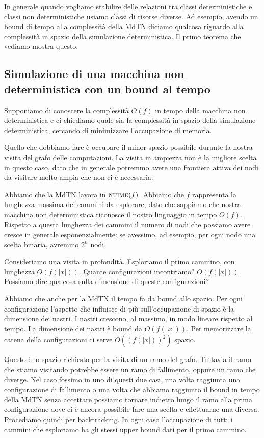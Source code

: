 
In generale quando vogliamo stabilire delle relazioni tra classi deterministiche e classi non
deterministiche usiamo classi di risorse diverse. Ad esempio, avendo un bound di tempo alla
complessità della MdTN diciamo qualcosa riguardo alla complessità in spazio della simulazione
deterministica. Il primo teorema che vediamo mostra questo.

\subsection{Simulazione di una macchina non deterministica con un bound al tempo}

Supponiamo di conoscere la complessità $O(f)$ in tempo della macchina non deterministica e ci
chiediamo quale sia la complessità in spazio della simulazione deterministica, cercando di
minimizzare l'occupazione di memoria.

Quello che dobbiamo fare è occupare il minor spazio possibile durante la nostra visita del grafo
delle computazioni. La visita in ampiezza non è la migliore scelta in questo caso, dato che in
generale potremmo avere una frontiera attiva dei nodi da visitare molto ampia che non ci è
necessaria.

Abbiamo che la MdTN lavora in $\textsc{ntime}(f)$. Abbiamo che $f$ rappresenta la lunghezza massima dei
cammini da esplorare, dato che sappiamo che nostra macchina non deterministica riconosce il nostro
linguaggio in tempo $O(f)$. Rispetto a questa lunghezza dei cammini il numero di nodi che possiamo
avere cresce in generale esponenzialmente: se avessimo, ad esempio, per ogni nodo una scelta
binaria, avremmo $2^{n}$ nodi.

Consideriamo una visita in profondità. Esploriamo il primo cammino, con lunghezza $O(f(|x|))$.
Quante configurazioni incontriamo? $O(f(|x|))$. Possiamo dire qualcosa sulla dimensione di queste
configurazioni?

Abbiamo che anche per la MdTN il tempo fa da bound allo spazio. Per ogni configurazione l'aspetto
che influisce di più sull'occupazione di spazio è la dimensione dei nastri. I nastri crescono, al
massimo, in modo lineare rispetto al tempo. La dimensione dei nastri è bound da $O(f(|x|))$. Per
memorizzare la catena della configurazioni ci serve $O((f(|x|))^{2})$ spazio.

Questo è lo spazio richiesto per la visita di un ramo del grafo. Tuttavia il ramo che stiamo
visitando potrebbe essere un ramo di fallimento, oppure un ramo che diverge. Nel caso fossimo in uno
di questi due casi, una volta raggiunta una configurazione di fallimento o una volta che abbiamo
raggiunto il bound in tempo della MdTN senza accettare possiamo tornare indietro lungo il ramo alla
prima configurazione dove ci è ancora possibile fare una scelta e effettuarne una diversa.
Procediamo quindi per backtracking. In ogni caso l'occupazione di tutti i cammini che esploriamo ha
gli stessi upper bound dati per il primo cammino.

